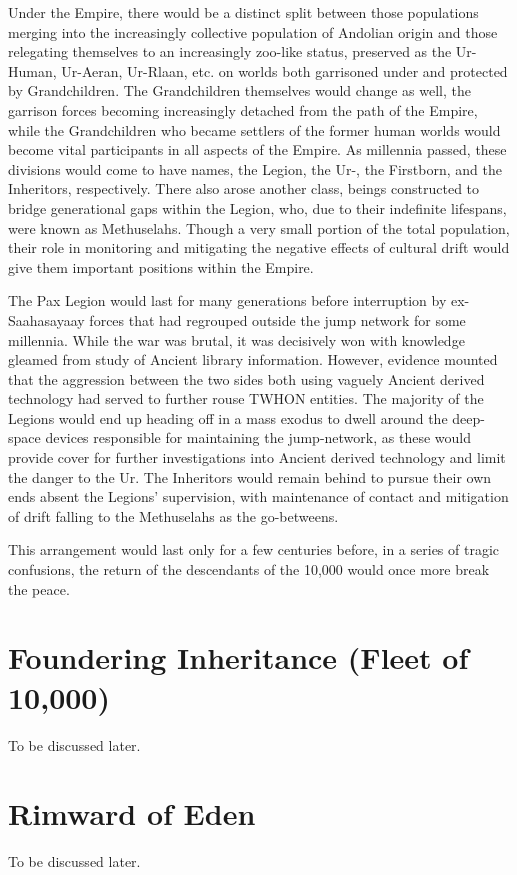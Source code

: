 Under the Empire, there would be a distinct split between those
populations merging into the increasingly collective population of
Andolian origin and those relegating themselves to an increasingly
zoo-like status, preserved as the Ur-Human, Ur-Aeran, Ur-Rlaan,
etc. on worlds both garrisoned under and protected by
Grandchildren. The Grandchildren themselves would change as well, the
garrison forces becoming increasingly detached from the path of the
Empire, while the Grandchildren who became settlers of the former
human worlds would become vital participants in all aspects of the
Empire. As millennia passed, these divisions would come to have names,
the Legion, the Ur-, the Firstborn, and the Inheritors,
respectively. There also arose another class, beings constructed to
bridge generational gaps within the Legion, who, due to their
indefinite lifespans, were known as Methuselahs. Though a very small
portion of the total population, their role in monitoring and
mitigating the negative effects of cultural drift would give them
important positions within the Empire.

The Pax Legion would last for many generations before interruption by
ex-Saahasayaay forces that had regrouped outside the jump network for
some millennia. While the war was brutal, it was decisively won with
knowledge gleamed from study of Ancient library information. However,
evidence mounted that the aggression between the two sides both using
vaguely Ancient derived technology had served to further rouse TWHON
entities. The majority of the Legions would end up heading off in a
mass exodus to dwell around the deep-space devices responsible for
maintaining the jump-network, as these would provide cover for further
investigations into Ancient derived technology and limit the danger to
the Ur. The Inheritors would remain behind to pursue their own ends
absent the Legions' supervision, with maintenance of contact and
mitigation of drift falling to the Methuselahs as the go-betweens.

This arrangement would last only for a few centuries before, in a
series of tragic confusions, the return of the descendants of the
10,000 would once more break the peace.

\section{Foundering Inheritance (Fleet of 10,000)}
To be discussed later.
\section{Rimward of Eden}
To be discussed later.
